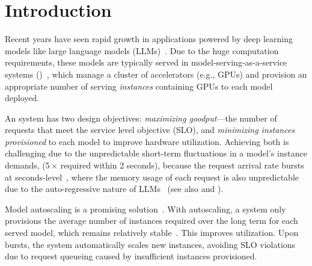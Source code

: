 \section{Introduction}
\label{sec:intro}

\noindent
Recent years have seen rapid growth in applications powered
by deep learning models like large language models (LLMs)~\cite{aws-rekognition,chatgpt,copilot,sora,stability-ai}.
Due to the huge computation requirements,
these models are typically served in model-serving-as-a-service systems ({\maas})~\cite{serverless-together-ai,serverless-ray,deepinfra,DBLP:conf/asplos/YangZLZLZCL22,ali-serverless-llm,aws-serverless-llm,DBLP:journals/corr/abs-2401-14351},
which manage a cluster of accelerators (e.g., GPUs) 
and provision an appropriate number of serving \emph{instances} containing GPUs
to each model deployed.


An {\maas} system has two design objectives:
\emph{maximizing goodput}---the number of requests
that meet the service level objective (SLO), and
\emph{minimizing instances provisioned} to each model to improve hardware utilization.
Achieving both is challenging
 due to the unpredictable short-term fluctuations in a model's instance demands,
 (5\,$\times$ required within 2 seconds),
 because the request arrival rate bursts at seconds-level~\cite{alpaserve,DBLP:conf/nsdi/0025TKS23},
 where the memory usage of each request is also unpredictable due to the
 auto-regressive nature of LLMs~\cite{alpaserve,DBLP:conf/nsdi/0025TKS23,DBLP:journals/corr/abs-2401-14351} (see also { and \textsection{\ref{sec:problem-statement}}}).

 Model autoscaling is a promising solution~\cite{DBLP:conf/asplos/YangZLZLZCL22,serverless-ray,DBLP:journals/corr/abs-2401-14351,kserve}.
 With autoscaling,
  a {\maas} system only provisions the average number of instances required
  over the long term for each served model, which remains relatively stable~\cite{wang2024burstgpt}.
  This improves utilization.
  Upon bursts,
  the system automatically scales new instances,
  avoiding SLO violations due to request queueing caused by insufficient instances provisioned.

